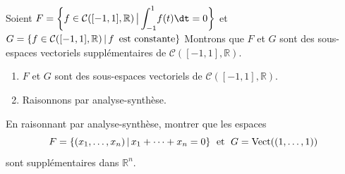 \documentclass[a4paper,10pt]{report}
\newcommand{\Int}[2]{\ensuremath{\mathchoice%
	{{\displaystyle\int_{#1}^{#2}}}
	{{\displaystyle\int_{#1}^{#2}}}
	{\int_{#1}^{#2}}
	{\int_{#1}^{#2}}
	}}
\begin{document}
\begin{Exemple} Soient $F = \left\lbrace f \in \mathcal{C}([-1,1], \mathbb{R}) \, \big{\vert} \, \Int{ - 1}{1} f(t) \dt = 0\right\rbrace$ et $G = \left\lbrace  f \in \mathcal{C}([-1,1], \mathbb{R})\, \vert \, f \, \hbox{ est constante} \right\rbrace$
Montrons que $F$ et $G$ sont des sous-espaces vectoriels supplémentaires de $\mathcal{C}([-1,1], \mathbb{R})$.
\begin{enumerate}
\item $F$ et $G$ sont des sous-espaces vectoriels de $\mathcal{C}([-1,1], \mathbb{R})$.
\item Raisonnons par analyse-synthèse.
%
%
%
%
%
\end{enumerate}
\vspace{17cm}
\end{Exemple}
%

\begin{ApplicationDirecte}\label{Exo}  En raisonnant par analyse-synthèse, montrer que les espaces 
$$ F = \lbrace (x_1, \ldots, x_n) \, \vert \, x_1 + \cdots + x_n = 0 \rbrace \; \hbox{ et } \; G= \textrm{Vect}((1, \ldots, 1)) $$
sont supplémentaires dans $\mathbb{R}^n$.
\end{ApplicationDirecte}
\end{document}
